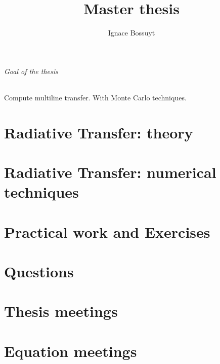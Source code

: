 \documentclass[a4paper,10pt,twoside]{article}
\title{Master thesis}
\author{Ignace Bossuyt}
\let\Oldparagraph\paragraph
\renewcommand{\paragraph}{\FloatBarrier\Oldparagraph}
\begin{document}
\maketitle
\tableofcontents

\paragraph{Goal of the thesis}
Compute multiline transfer. With Monte Carlo techniques.

\part{Radiative Transfer: theory}


\cleardoublepage
\part{Radiative Transfer: numerical techniques}


\cleardoublepage
\part{Practical work and Exercises}


\cleardoublepage
\part{Questions}


\cleardoublepage
\part{Thesis meetings}


\part{Equation meetings}


\medskip
\newpage
\printbibliography
\end{document}
